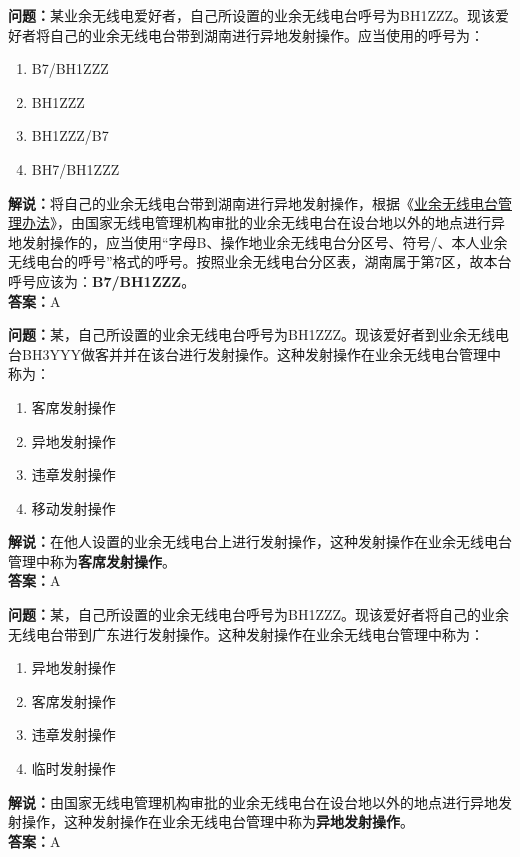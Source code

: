 \textbf{问题：}某业余无线电爱好者，自己所设置的业余无线电台呼号为BH1ZZZ。现该爱好者将自己的业余无线电台带到湖南进行异地发射操作。应当使用的呼号为：
\begin{enumerate}[label=\Alph*), leftmargin=1.5cm]
	\item B7/BH1ZZZ
	\item BH1ZZZ
	\item BH1ZZZ/B7
	\item BH7/BH1ZZZ
\end{enumerate}
\textbf{解说：}将自己的业余无线电台带到湖南进行异地发射操作，根据《\href{https://www.miit.gov.cn/jgsj/zfs/bmgz/art/2020/art_147b69815b3641caad9047735f94c860.html}{业余无线电台管理办法}》，由国家无线电管理机构审批的业余无线电台在设台地以外的地点进行异地发射操作的，应当使用“字母B、操作地业余无线电台分区号、符号/、本人业余无线电台的呼号”格式的呼号。按照业余无线电台分区表，湖南属于第7区，故本台呼号应该为：\textbf{B7/BH1ZZZ}。\\\textbf{答案：}A

\textbf{问题：}某，自己所设置的业余无线电台呼号为BH1ZZZ。现该爱好者到业余无线电台BH3YYY做客并并在该台进行发射操作。这种发射操作在业余无线电台管理中称为：
\begin{enumerate}[label=\Alph*), leftmargin=1.5cm]
	\item 客席发射操作
	\item 异地发射操作
	\item 违章发射操作
	\item 移动发射操作
\end{enumerate}
\textbf{解说：}在他人设置的业余无线电台上进行发射操作，这种发射操作在业余无线电台管理中称为\textbf{客席发射操作}。\\\textbf{答案：}A%

\textbf{问题：}某，自己所设置的业余无线电台呼号为BH1ZZZ。现该爱好者将自己的业余无线电台带到广东进行发射操作。这种发射操作在业余无线电台管理中称为：
\begin{enumerate}[label=\Alph*), leftmargin=1.5cm]
	\item 异地发射操作
	\item 客席发射操作
	\item 违章发射操作
	\item 临时发射操作
\end{enumerate}
\textbf{解说：}由国家无线电管理机构审批的业余无线电台在设台地以外的地点进行异地发射操作，这种发射操作在业余无线电台管理中称为\textbf{异地发射操作}。\\\textbf{答案：}A%

